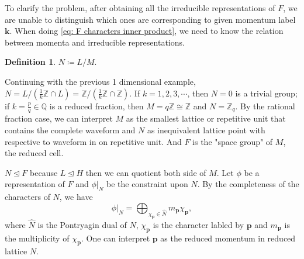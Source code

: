 \documentclass[11pt, reqno]{amsart}
\theoremstyle{definition}
\newtheorem{definition}[theorem]{Definition}
\theoremstyle{remark}
\newcommand{\lhdeq}{\trianglelefteq}
\begin{document}
To clarify the problem, after obtaining all the irreducible representations of $F$, we are unable to distinguish which ones are corresponding to given momentum label $\mathbf{k}$. When doing \ref{eq: F characters inner product}, we need to know the relation between momenta and irreducible representations.


\begin{definition}
    $N\coloneqq L/M$.
\end{definition}

Continuing with the previous 1 dimensional example, $N=L/\left( \frac{1}{k}\mathbb{Z} \cap L \right)=\mathbb{Z} /\left( \frac{1}{k}\mathbb{Z} \cap \mathbb{Z} \right)$. If $k=1,2,3,\cdots$, then $N=0$ is a trivial group; if $k=\frac{p}{q}\in\mathbb{Q}$ is a reduced fraction, then $M=q\mathbb{Z}\cong \mathbb{Z}$ and $N=\mathbb{Z}_q$. By the rational fraction case, we can interpret $M$ as the smallest lattice or repetitive unit that contains the complete waveform and $N$ as inequivalent lattice point with respective to waveform in on repetitive unit. And $F$ is the "space group" of $M$, the reduced cell.

$N\lhdeq F$ because $L\lhdeq H$ then we can quotient both side of $M$. Let $\phi$ be a representation of $F$ and $\left.\phi\right|_N$ be the constraint upon $N$. By the completeness of the characters of $N$, we have
\begin{equation}
    \left. \phi \right|_N=\bigoplus_{\chi _{\mathbf{p}}\in \widehat{N}}{m_{\mathbf{p}}\chi_\mathbf{p}},
\end{equation}
where $\widehat{N}$ is the Pontryagin dual of $N$, $\chi _{\mathbf{p}}$ is the character labled by $\mathbf{p}$ and $m_\mathbf{p}$ is the multiplicity of $\chi_\mathbf{p}$. One can interpret $\mathbf{p}$ as the reduced momentum in reduced lattice $N$.
\end{document}
